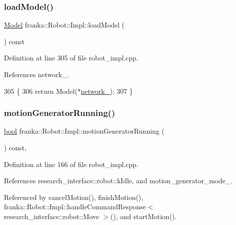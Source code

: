 \subsubsection{\texorpdfstring{load\+Model()}{loadModel()}}
{\footnotesize\ttfamily \hyperlink{classfranka_1_1Model}{Model} franka\+::\+Robot\+::\+Impl\+::load\+Model (\begin{DoxyParamCaption}{ }\end{DoxyParamCaption}) const}



Definition at line 305 of file robot\+\_\+impl.\+cpp.



References network\+\_\+.


\begin{DoxyCode}
305                                  \{
306   \textcolor{keywordflow}{return} Model(*\hyperlink{classfranka_1_1Robot_1_1Impl_acecf3b158ccd1c2ed7e76971f1e6a192}{network\_});
307 \}
\end{DoxyCode}
\mbox{\label{classfranka_1_1Robot_1_1Impl_aa6b34693c27b529a52f7ea5a607c7252}} 
\subsubsection{\texorpdfstring{motion\+Generator\+Running()}{motionGeneratorRunning()}}
{\footnotesize\ttfamily \hyperlink{classbool}{bool} franka\+::\+Robot\+::\+Impl\+::motion\+Generator\+Running (\begin{DoxyParamCaption}{ }\end{DoxyParamCaption}) const\hspace{0.3cm}{\ttfamily [protected]}, {\ttfamily [noexcept]}}



Definition at line 166 of file robot\+\_\+impl.\+cpp.



References research\+\_\+interface\+::robot\+::k\+Idle, and motion\+\_\+generator\+\_\+mode\+\_\+.



Referenced by cancel\+Motion(), finish\+Motion(), franka\+::\+Robot\+::\+Impl\+::handle\+Command\+Response$<$ research\+\_\+interface\+::robot\+::\+Move $>$(), and start\+Motion().


